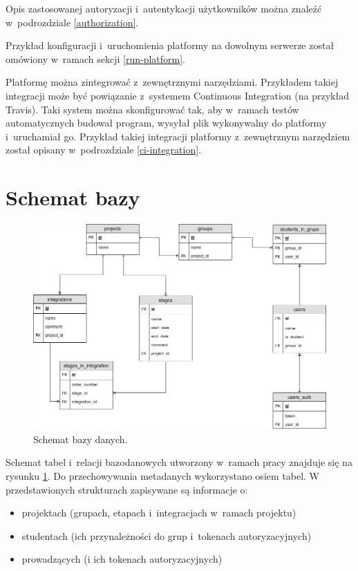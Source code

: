 Opis zastosowanej autoryzacji i~autentykacji użytkowników można znaleźć w~podrozdziale \ref{authorization}.

Przykład konfiguracji i~uruchomienia platformy na dowolnym serwerze został omówiony w~ramach sekcji \ref{run-platform}.

Platformę można zintegrować z~zewnętrznymi narzędziami.
Przykładem takiej integracji może być powiązanie z~systemem Continuous Integration (na przykład Travis).
Taki system można skonfigurować tak, aby w~ramach testów automatycznych budował program, wysyłał plik wykonywalny do platformy i~uruchamiał go.
Przykład takiej integracji platformy z~zewnętrznym narzędziem został opisany w~podrozdziale \ref{ci-integration}.

\section{Schemat bazy}
\label{database}

\begin{figure}[h]
    \centering
    \includegraphics[width = 13cm]{chapter05/db_schema.png}
    \caption{Schemat bazy danych.}
    \label{fig:platform-db-schema}
\end{figure}

Schemat tabel i~relacji bazodanowych utworzony w~ramach pracy znajduje się na rysunku \ref{fig:platform-db-schema}.
Do przechowywania metadanych wykorzystano osiem tabel.
W przedstawionych strukturach zapisywane są informacje o:
\begin{itemize}
    \item projektach (grupach, etapach i~integracjach w~ramach projektu)
    \item studentach (ich przynależności do grup i~tokenach autoryzacyjnych)
    \item prowadzących (i ich tokenach autoryzacyjnych)
\end{itemize}

